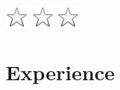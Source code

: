 \documentclass[]{cv-class}
\begin{document}
\begin{aside}
{    \includegraphics[scale=0.30]{img/star_empty.png}
    \includegraphics[scale=0.30]{img/star_empty.png}
    \includegraphics[scale=0.30]{img/star_empty.png}}
    
\end{aside}

\vspace{0.75cm}
\section{Experience}
\end{document}
